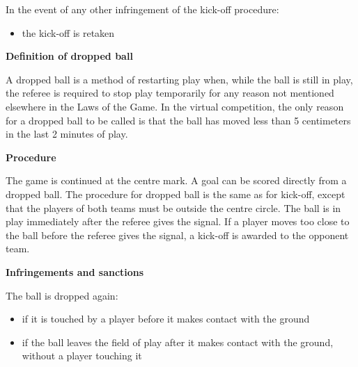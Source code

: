 In the event of any other infringement of the kick-off procedure: 

\begin{itemize}
\item the kick-off is retaken
\end{itemize}

{\bfseries Definition of dropped ball}

\headlinebox

A dropped ball is a method of restarting play when,
while the ball is still in play,
the referee is required to stop play temporarily for any reason not
  mentioned elsewhere in the Laws of the Game.
In the virtual competition, the only reason for a dropped ball to be called is that the ball has moved less than 5 centimeters in the last 2 minutes of play.


\bigskip

{\bfseries Procedure}

\headlinebox

The game is continued at the centre mark. A goal can be scored directly from a dropped ball. The procedure for dropped ball is the same as for kick-off, except that the players of both teams must be outside the centre circle. The ball is in play immediately
after the referee gives the signal. If a player moves too close to the ball before the referee gives the signal, a kick-off
is awarded to the opponent team.



\bigskip

{\bfseries Infringements and sanctions}

\headlinebox

The ball is dropped again:

\begin{itemize}
\item if it is touched by a player before it makes contact with the ground
\item if the ball leaves the field of play after it makes contact with the
  ground, without a player touching it
\end{itemize}

\bigskip

